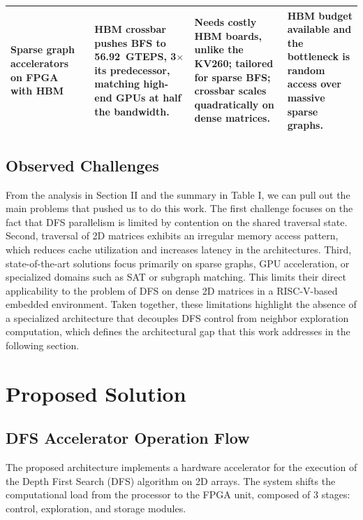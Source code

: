 \documentclass[conference]{IEEEtran}
\begin{document}
\begin{table}[t]
\begin{tabular}{@{}p{2.6cm}p{0.9cm}p{4.6cm}p{4.6cm}p{4.0cm}@{}}
Sparse graph accelerators on FPGA with HBM
& \cite{li2024scalabfs2}
& HBM crossbar pushes BFS to 56.92~GTEPS, 3$\times$ its predecessor, matching high-end GPUs at half the bandwidth.
& Needs costly HBM boards, unlike the KV260; tailored for sparse BFS; crossbar scales quadratically on dense matrices.
& HBM budget available and the bottleneck is random access over massive sparse graphs. \\
\bottomrule
\end{tabular}
\end{table}

\subsection{Observed Challenges}
From the analysis in Section II and the summary in Table I, we can pull out the main problems that pushed us to do this work. 
The first challenge focuses on the fact that DFS parallelism is limited by contention on the shared traversal state.
Second, traversal of 2D matrices exhibits an irregular memory access pattern, which reduces cache utilization and increases latency in the architectures. 
Third, state-of-the-art solutions focus primarily on sparse graphs, GPU acceleration, or specialized domains such as SAT or subgraph matching. 
This limits their direct applicability to the problem of DFS on dense 2D matrices in a RISC-V-based embedded environment. 
Taken together, these limitations highlight the absence of a specialized architecture that decouples DFS control from neighbor exploration computation, which defines the architectural gap that this work addresses in the following section.


\section{Proposed Solution}

\subsection{DFS Accelerator Operation Flow}

The proposed architecture implements a hardware accelerator for the execution of the Depth First Search (DFS)
algorithm on 2D arrays. The system shifts the computational load from the processor to the FPGA unit,
composed of 3 stages: control, exploration, and storage modules.
\end{document}
